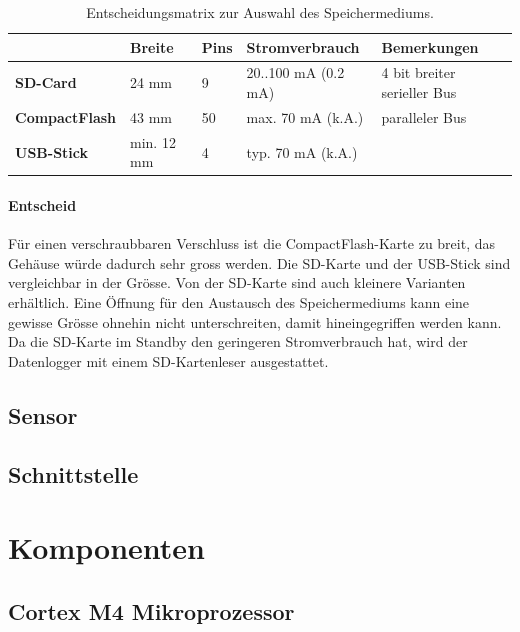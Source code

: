 \begin{table}
\begin{tabular}{|l|l|l|l|l|}
	\hline
	                      & \textbf{Breite} & \textbf{Pins} & \textbf{Stromverbrauch} & \textbf{Bemerkungen}        \\ \hline
	\textbf{SD-Card}      & 24 mm           & 9             & 20..100 mA (0.2 mA)     & 4 bit breiter serieller Bus \\ \hline
	\textbf{CompactFlash} & 43 mm           & 50            & max. 70 mA (k.A.)       & paralleler Bus              \\ \hline
	\textbf{USB-Stick}    & min. 12 mm      & 4             & typ. 70 mA (k.A.) &  \\ \hline
\end{tabular} 
\caption{Entscheidungsmatrix zur Auswahl des Speichermediums.}
\label{table.speichermedium}
\end{table} 



\paragraph{Entscheid} Für einen verschraubbaren Verschluss ist die CompactFlash-Karte zu breit, das Gehäuse würde dadurch sehr gross werden. Die SD-Karte und der USB-Stick sind vergleichbar in der Grösse. Von der SD-Karte sind auch kleinere Varianten erhältlich. Eine Öffnung für den Austausch des Speichermediums kann eine gewisse Grösse ohnehin nicht unterschreiten, damit hineingegriffen werden kann. Da die SD-Karte im Standby den geringeren Stromverbrauch hat, wird der Datenlogger mit einem SD-Kartenleser ausgestattet.

\subsection{Sensor}

\subsection{Schnittstelle}



\section{Komponenten}
\subsection{Cortex M4 Mikroprozessor}

